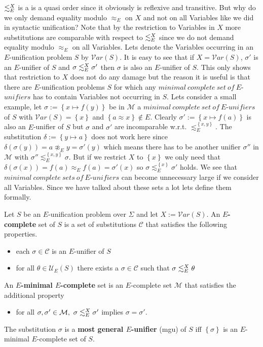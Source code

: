 $\lesssim^X_E$ is a is a quasi order since it obviously is reflexive and transitive. But why do we only demand equality modulo $\approx_E$ on $X$ and not on all Variables like we did in syntactic unification? Note that by the restriction to Variables in $X$ more substitutions are comparable with respect to $\lesssim^X_E$ since we do not demand equality modulo $\approx_E$ on all Variables. Lets denote the Variables occurring in an $E$-unification problem $S$ by $\mathcal{V}ar(S)$. It is easy to see that if $X=\mathcal{V}ar(S)$, $\sigma'$ is an $E$-unifier of $S$ and $\sigma\lesssim^X_E\sigma'$ then $\sigma$ is also an $E$-unifier of $S$. This only shows that restriction to $X$ does not do any damage but the reason it is useful is that there are $E$-unification problems $S$ for which any $minimal\ complete\ set\ of\ E$-$unifiers$ has to contain Variables not occurring in $S$. Lets consider a small example, let $\sigma:=\left\lbrace x\mapsto f(y)\right\rbrace$ be in $\mathcal{M}$ a $minimal\ complete\ set\ of\ E$-$unifiers$ of $S$ with $\mathcal{V}ar(S)=\left\lbrace x\right\rbrace$ and $\left\lbrace a\approx x\right\rbrace \notin E$. Clearly $\sigma':=\left\lbrace x\mapsto f(a)\right\rbrace$ is also an $E$-unifier of $S$ but $\sigma$ and $\sigma'$ are incomparable w.r.t. $\lesssim^{\left\lbrace x,y\right\rbrace }_E$. The substitution $\delta:=\left\lbrace y\mapsto a\right\rbrace $ does not work here since $\delta(\sigma(y))=a \not\approx_E y=\sigma'(y)$ which means there has to be another unifier $\sigma''$ in $\mathcal{M}$ with $\sigma''\lesssim^{\left\lbrace x,y\right\rbrace }_E\sigma$. But if we restrict $X$ to $\left\lbrace x\right\rbrace $ we only need that $\delta(\sigma(x))=f(a) \approx_E f(a)=\sigma'(x)$ so $\sigma\lesssim^{\left\lbrace x\right\rbrace }_E\sigma'$ holds. We see that $minimal\ complete\ sets\ of\ E$-$unifiers$ can become unnecessary large if we consider all Variables. Since we have talked about these sets a lot lets define them formally.
\begin{definition}
Let $S$ be an $E$-unification problem over $\Sigma$ and let $X:=\mathcal{V}ar(S)$. An \textbf{$E$-complete} set of $S$ is a set of substitutions $\mathcal{C}$ that satisfies the following properties.
\begin{itemize}
\item each $\sigma \in \mathcal{C}$ is an $E$-unifier of $S$
\item for all $\theta \in\mathcal{U}_E(S)$ there exists a $\sigma \in \mathcal{C}$ such that $\sigma\lesssim^X_E\theta$
\end{itemize}
An \textbf{$E$-minimal $E$-complete} set is an $E$-complete set  $\mathcal{M}$ that satisfies the additional property
\begin{itemize}
\item for all $\sigma,\sigma'\in\mathcal{M},\ \sigma\moreGeneral\sigma'$ implies $\sigma=\sigma'$.
\end{itemize}
The substitution $\sigma$ is a \textbf{most general $E$-unifier} (mgu) of $S$ iff $\left\lbrace \sigma\right\rbrace$ is an $E$-minimal $E$-complete set of $S$.
\end{definition}
